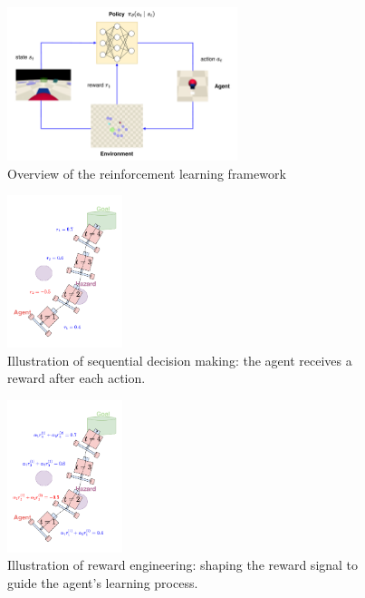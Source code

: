 \documentclass[8pt, aspectratio=169]{beamer} %
\begin{document}
\begin{frame}{\insertsubsectionhead}

  \begin{figure}
    \includegraphics[width=0.6\textwidth]{figures/rl1.pdf}
    \caption{Overview of the reinforcement learning framework}
  \end{figure}

\end{frame}

\begin{frame}{\insertsubsectionhead}

  \begin{figure}
    \includegraphics[width=0.3\textwidth]{figures/rl2.pdf}
    \caption{Illustration of sequential decision making: the agent receives a reward after each action.}
  \end{figure}

\end{frame}


\begin{frame}{\insertsubsectionhead}

  \begin{figure}
    \includegraphics[width=0.3\textwidth]{figures/reward-engineering.pdf}
    \caption{Illustration of reward engineering: shaping the reward signal to guide the agent's learning process.}
  \end{figure}

\end{frame}
\end{document}
